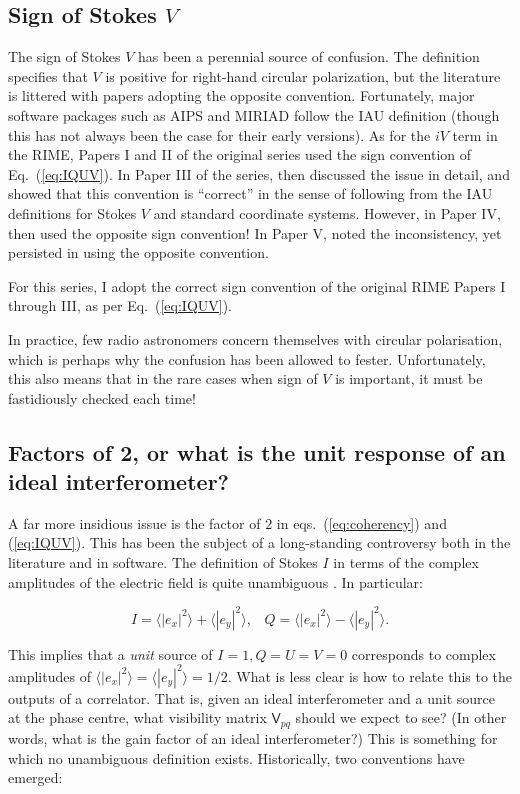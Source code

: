 \documentclass{aa}
\newcommand{\coh}[2]{\mathsf{{#1}}_{{#2}}}
\begin{document}
\subsection{Sign of Stokes $V$}

The sign of Stokes $V$ has been a perennial source of confusion. The \citet{IAU74} definition specifies that $V$ is positive for right-hand circular polarization, but the literature is littered with papers adopting the opposite convention. Fortunately, major software packages such as AIPS and MIRIAD follow the IAU definition (though this 
has not always been the case for their early versions). As for the $iV$ term in the RIME, Papers I and II of the original series \citep{ME1,ME2} used the sign convention of Eq.~(\ref{eq:IQUV}). In Paper III of the series, \citet{ME3} then discussed the issue in detail, and showed that this convention is ``correct'' in the sense of following from the IAU definitions for Stokes $V$ and standard coordinate systems. However, in Paper IV, \citet{ME4} then used the opposite sign convention! In Paper V, \citet{ME5} noted the inconsistency, yet persisted in using the opposite convention. 

For this series, I adopt the correct sign convention of the original RIME Papers I through III, as per Eq.~(\ref{eq:IQUV}).

In practice, few radio astronomers concern themselves with circular polarisation, which is perhaps why the confusion has been allowed to fester. Unfortunately, this also means that in the rare cases when sign of $V$ is important, it
must be fastidiously checked each time!

\subsection{\label{sec:factor2}Factors of 2, or what is the unit response of an ideal interferometer?}

A far more insidious issue is the factor of $2$ in eqs.~(\ref{eq:coherency}) and (\ref{eq:IQUV}). This has been the subject of a long-standing controversy both in the literature and in software. The definition of Stokes $I$ in terms of the complex amplitudes of the electric field is quite unambiguous \citep{tms,born-wolf}. In particular:

\[
I=\langle |e_x|^2\rangle  + \langle |e_y|^2\rangle, \;\;\;
Q=\langle |e_x|^2\rangle  - \langle |e_y|^2\rangle.
\]

This implies that a {\em unit} source of $I=1, Q=U=V=0$ corresponds to complex amplitudes of $\langle |e_x|^2\rangle =\langle |e_y|^2\rangle = 1/2$. What is less clear is how to relate this to the outputs of a correlator. That is, given an ideal interferometer and a unit source at the phase centre, what visibility matrix $\coh{V}{pq}$ should we expect to see? (In other words, what is the gain factor of an ideal interferometer?) This is something for which no unambiguous definition exists. Historically, two conventions have emerged:
\end{document}
